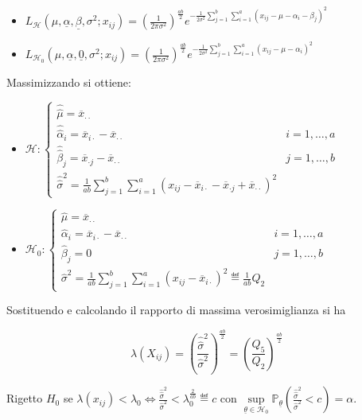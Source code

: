 \documentclass[hidelinks, 10pt]{article}
\begin{document}
\begin{itemize}
\item $ L_{\mathcal{H}} (\mu, \underline{\alpha}, \underline{\beta}, \sigma^{2}; x_{ij}) = \left( \frac{1}{2 \pi \sigma^{2}} \right)^{\frac{ab}{2}} e^{- \frac{1}{2 \sigma^{2}} \sum\limits_{j = 1}^{b} \sum\limits_{i = 1}^{a} (x_{ij} - \mu - \alpha_{i} - \beta_{j})^{2}} $
\item $ L_{\mathcal{H}_{0}} (\mu, \underline{\alpha}, \underline{0}, \sigma^{2}; x_{ij}) = \left( \frac{1}{2 \pi \sigma^{2}} \right)^{\frac{ab}{2}} e^{- \frac{1}{2 \sigma^{2}} \sum\limits_{j = 1}^{b} \sum\limits_{i = 1}^{a} (x_{ij} - \mu - \alpha_{i})^{2}} $
\end{itemize}

Massimizzando si ottiene:
\begin{itemize}
\item $ \mathcal{H}: \begin{cases} \hat{\hat{\mu}} = \overline{x}_{\cdot \cdot} \\ \hat{\hat{\alpha}}_{i} = \overline{x}_{i \cdot} - \overline{x}_{\cdot \cdot} & i = 1, \dotsc, a  \\ \hat{\hat{\beta}}_{j} = \overline{x}_{\cdot j} - \overline{x}_{\cdot \cdot} & j = 1, \dotsc, b \\ \hat{\hat{\sigma}}^{2} = \frac{1}{ab} \sum\limits_{j = 1}^{b} \sum\limits_{i = 1}^{a} (x_{ij} - \overline{x}_{i \cdot} - \overline{x}_{\cdot j} + \overline{x}_{\cdot \cdot})^{2} \end{cases} $
\item $ \mathcal{H}_{0}: \begin{cases} \hat{\mu} = \overline{x}_{\cdot \cdot} \\ \hat{\alpha}_{i} = \overline{x}_{i \cdot} - \overline{x}_{\cdot \cdot} & i = 1, \dotsc, a \\ \hat{\beta}_{j} = 0 & j = 1, \dotsc, b \\ \hat{\sigma}^{2} = \frac{1}{ab} \sum\limits_{j = 1}^{b} \sum\limits_{i = 1}^{a} (x_{ij} - \overline{x}_{i \cdot})^{2} \eqdef \frac{1}{ab} Q_{2} \end{cases} $
\end{itemize}

Sostituendo e calcolando il rapporto di massima verosimiglianza si ha

\[ \lambda (X_{ij}) = \left( \frac{\hat{\hat{\sigma}}^{2}}{\hat{\sigma}^{2}} \right)^{\frac{ab}{2}} = \left( \frac{Q_{5}}{Q_{2}} \right)^{\frac{ab}{2}} \]

Rigetto $ H_{0} $ se $ \lambda (x_{ij}) < \lambda_{0} \iff \frac{\hat{\hat{\sigma}}^{2}}{\hat{\sigma}^{2}} < \lambda_{0}^{\frac{2}{ab}} \eqdef c $ con $ \sup\limits_{\underline{\theta} \in \mathcal{H}_{0}} \mathbb{P}_{\underline{\theta}} \left( \frac{\hat{\hat{\sigma}}^{2}}{\hat{\sigma}^{2}} < c \right) = \alpha $.
\end{document}
